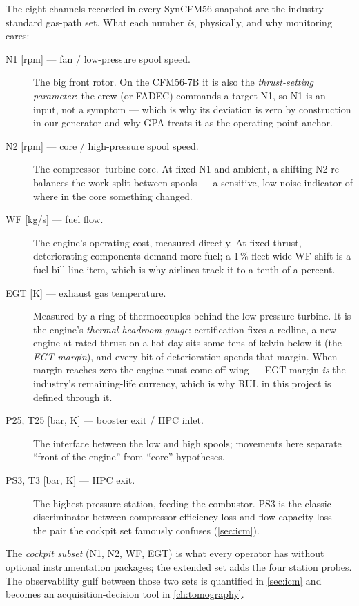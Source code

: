 The eight channels recorded in every SynCFM56 snapshot are the industry-standard gas-path
set. What each number \emph{is}, physically, and why monitoring cares:

\begin{description}
  \item[N1 {[}rpm{]} --- fan / low-pressure spool speed.] The big front rotor. On the
    CFM56-7B it is also the \emph{thrust-setting parameter}: the crew (or FADEC) commands
    a target N1, so N1 is an input, not a symptom --- which is why its deviation is zero
    by construction in our generator and why GPA treats it as the operating-point anchor.
  \item[N2 {[}rpm{]} --- core / high-pressure spool speed.] The compressor--turbine core.
    At fixed N1 and ambient, a shifting N2 re-balances the work split between spools ---
    a sensitive, low-noise indicator of where in the core something changed.
  \item[WF {[}kg/s{]} --- fuel flow.] The engine's operating cost, measured directly. At
    fixed thrust, deteriorating components demand more fuel; a 1\,\% fleet-wide WF shift
    is a fuel-bill line item, which is why airlines track it to a tenth of a percent.
  \item[EGT {[}K{]} --- exhaust gas temperature.] Measured by a ring of thermocouples
    behind the low-pressure turbine. It is the engine's \emph{thermal headroom gauge}:
    certification fixes a redline, a new engine at rated thrust on a hot day sits some
    tens of kelvin below it (the \emph{EGT margin}), and every bit of deterioration
    spends that margin. When margin reaches zero the engine must come off wing ---
    EGT margin \emph{is} the industry's remaining-life currency, which is why RUL in
    this project is defined through it.
  \item[P25, T25 {[}bar, K{]} --- booster exit / HPC inlet.] The interface between the
    low and high spools; movements here separate ``front of the engine'' from ``core''
    hypotheses.
  \item[PS3, T3 {[}bar, K{]} --- HPC exit.] The highest-pressure station, feeding the
    combustor. PS3 is the classic discriminator between compressor efficiency loss and
    flow-capacity loss --- the pair the cockpit set famously confuses
    (\cref{sec:icm}).
\end{description}

The \emph{cockpit subset} (N1, N2, WF, EGT) is what every operator has without optional
instrumentation packages; the extended set adds the four station probes. The
observability gulf between those two sets is quantified in \cref{sec:icm} and becomes an
acquisition-decision tool in \cref{ch:tomography}.

